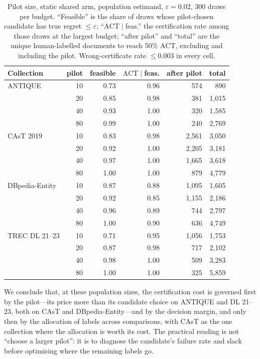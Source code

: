 \documentclass{article}
\newcommand{\eps}{\varepsilon}
\newcommand{\ACT}{\mathrm{ACT}}
\begin{document}
\begin{table}[htbp]\centering\scriptsize\setlength{\tabcolsep}{3pt}
\caption{Pilot size, static shared arm, population estimand, $\eps=0.02$, 300 draws per budget. ``Feasible'' is the share of draws whose pilot-chosen candidate has true regret $\le\eps$; ``$\ACT\mid$feas.'' the certification rate among those draws at the largest budget; ``after pilot'' and ``total'' are the unique human-labelled documents to reach 50\% $\ACT$, excluding and including the pilot. Wrong-certificate rate $\le0.003$ in every cell.}\label{tab:pilot}
\begin{tabular}{lrrrrr}\toprule
Collection & pilot & feasible & $\ACT\mid$feas. & after pilot & total\\\midrule
ANTIQUE & 10 & 0.73 & 0.96 & 574 & 890\\
 & 20 & 0.85 & 0.98 & 381 & 1{,}015\\
 & 40 & 0.93 & 1.00 & 320 & 1{,}585\\
 & 80 & 0.99 & 1.00 & 240 & 2{,}769\\
\midrule
CAsT 2019 & 10 & 0.83 & 0.98 & 2{,}561 & 3{,}050\\
 & 20 & 0.92 & 1.00 & 2{,}205 & 3{,}181\\
 & 40 & 0.97 & 1.00 & 1{,}665 & 3{,}618\\
 & 80 & 1.00 & 1.00 & 879 & 4{,}779\\
\midrule
DBpedia-Entity & 10 & 0.87 & 0.88 & 1{,}095 & 1{,}605\\
 & 20 & 0.92 & 0.85 & 1{,}155 & 2{,}186\\
 & 40 & 0.96 & 0.89 & 744 & 2{,}797\\
 & 80 & 1.00 & 0.90 & 636 & 4{,}749\\
\midrule
TREC DL 21--23 & 10 & 0.71 & 0.95 & 1{,}056 & 1{,}753\\
 & 20 & 0.87 & 0.98 & 717 & 2{,}102\\
 & 40 & 0.98 & 1.00 & 509 & 3{,}283\\
 & 80 & 1.00 & 1.00 & 325 & 5{,}859\\\bottomrule
\end{tabular}
\end{table}

We conclude that, at these population sizes, the certification cost is governed first by the pilot---its price more than its candidate choice on ANTIQUE and DL 21--23, both on CAsT and DBpedia-Entity---and by the decision margin, and only then by the allocation of labels across comparisons, with CAsT as the one collection where the allocation is worth its cost. The practical reading is not ``choose a larger pilot'': it is to diagnose the candidate's failure rate and slack before optimising where the remaining labels go.
\end{document}
